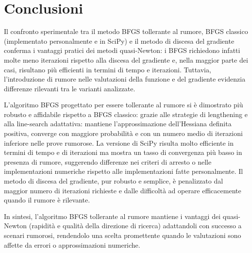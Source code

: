 \newpage
\section{Conclusioni}\label{sec:conclusioni}
Il confronto sperimentale tra il metodo BFGS tollerante al rumore, BFGS classico (implementato personalmente e in SciPy) e il metodo di discesa del gradiente conferma i vantaggi pratici dei metodi quasi-Newton: i BFGS richiedono infatti molte meno iterazioni rispetto alla discesa del gradiente e, nella maggior parte dei casi, risultano più efficienti in termini di tempo e iterazioni. Tuttavia, l’introduzione di rumore nelle valutazioni della funzione e del gradiente evidenzia differenze rilevanti tra le varianti analizzate.

L’algoritmo BFGS progettato per essere tollerante al rumore si è dimostrato più robusto e affidabile rispetto a BFGS classico: grazie alle strategie di lengthening e alla line-search adattativa: mantiene l’approssimazione dell’Hessiana definita positiva, converge con maggiore probabilità e con un numero medio di iterazioni inferiore nelle prove rumorose. La versione di SciPy risulta molto efficiente in termini di tempo e di iterazioni ma mostra un tasso di convergenza più basso in presenza di rumore, suggerendo differenze nei criteri di arresto o nelle implementazioni numeriche rispetto alle implementazioni fatte personalmente. Il metodo di discesa del gradiente, pur robusto e semplice, è penalizzato dal maggior numero di iterazioni richieste e dalle difficoltà ad operare efficacemente quando il rumore è rilevante.

In sintesi, l’algoritmo BFGS tollerante al rumore mantiene i vantaggi dei quasi-Newton (rapidità e qualità della direzione di ricerca) adattandoli con successo a scenari rumorosi, rendendolo una scelta promettente quando le valutazioni sono affette da errori o approssimazioni numeriche.